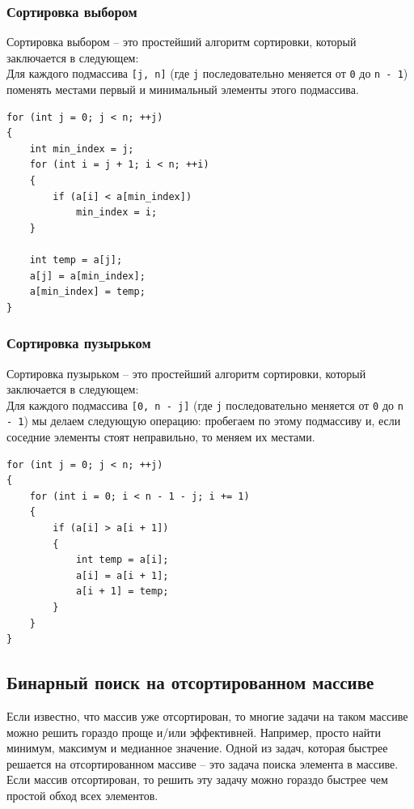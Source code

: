 \documentclass{article}
\begin{document}
\subsubsection*{Сортировка выбором} 
Сортировка выбором -- это простейший алгоритм сортировки, который заключается в следующем: \\
Для каждого подмассива \texttt{[j, n]} (где \texttt{j} последовательно меняется от \texttt{0} до \texttt{n - 1}) поменять местами первый и минимальный элементы этого подмассива. 


\begin{lstlisting}
for (int j = 0; j < n; ++j)
{
    int min_index = j;
    for (int i = j + 1; i < n; ++i)
    {
        if (a[i] < a[min_index])
            min_index = i;
    }

    int temp = a[j];
    a[j] = a[min_index];
    a[min_index] = temp;
}
\end{lstlisting}

\subsubsection*{Сортировка пузырьком} 
Сортировка пузырьком -- это простейший алгоритм сортировки, который заключается в следующем: \\
Для каждого подмассива \texttt{[0, n - j]} (где \texttt{j} последовательно меняется от \texttt{0} до \texttt{n - 1}) мы делаем следующую операцию: пробегаем по этому подмассиву и, если соседние элементы стоят неправильно, то меняем их местами.


\begin{lstlisting}
for (int j = 0; j < n; ++j)
{
    for (int i = 0; i < n - 1 - j; i += 1)
    {
        if (a[i] > a[i + 1])
        {
            int temp = a[i];
            a[i] = a[i + 1];
            a[i + 1] = temp;
        }
    }
}
\end{lstlisting}


\subsection*{Бинарный поиск на отсортированном массиве}
Если известно, что массив уже отсортирован, то многие задачи на таком массиве можно решить гораздо проще и/или эффективней. Например, просто найти минимум, максимум и медианное значение. Одной из задач, которая быстрее решается на отсортированном массиве -- это задача поиска элемента в массиве. Если массив отсортирован, то решить эту задачу можно гораздо быстрее чем простой обход всех элементов. \\
\end{document}
